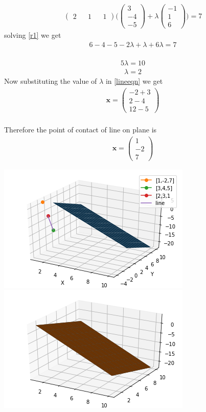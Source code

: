 \documentclass[10pt,a4paper,twocolumn]{article}
\numberwithin{equation}{section}
\begin{document}
\begin{gather}\label{r1}
\begin{pmatrix} 2 && 1 && 1\end{pmatrix} \Bigg( \begin{pmatrix}3 \\-4 \\-5\end{pmatrix}+\lambda\begin{pmatrix}-1 \\1 \\6\end{pmatrix} \Bigg)=7
\end{gather}
solving \ref{r1} we get \\
\begin{gather}  6 -4 -5-2\lambda+ \lambda+ 6 \lambda=7 \end{gather}
\\ \begin{gather} 5 \lambda=10 \end{gather}
\begin{gather}\label{la} 
\lambda=2 
\end{gather}
Now substituting the value of $\lambda$ in \ref{lineeqn} we get 
\begin{gather}\textbf{x}=\begin{pmatrix}-2+3\\2-4\\12-5 \end{pmatrix}\end{gather}
\\Therefore the point of contact of line on plane is
\\\begin{gather}\textbf{x}=\begin{pmatrix}1\\-2\\7 \end{pmatrix}\end{gather}
\pagebreak

\includegraphics{Figure_3}
\includegraphics{Figure_4}






\end{document}
